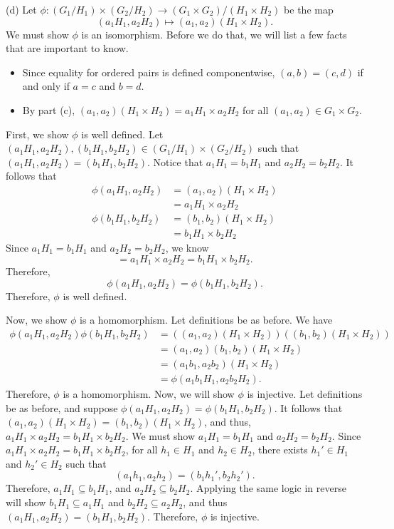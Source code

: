 \documentclass[11pt, letterpaper]{report}
\begin{document}
\begin{solution}
	(d) Let $\phi  : \left( G_1 / H_1 \right) \times \left( G_2 / H_2 \right)  \to \left( G_1 \times G_2 \right) / \left( H_1 \times H_2 \right) $ be the map
	\[
		(a_1H_1, a_2H_2)\mapsto (a_1,a_2)(H_1\times H_2)
	.\]
	We must show $\phi $ is an isomorphism. Before we do that, we will list a few facts that are important to know.
	\begin{itemize}
		\item Since equality for ordered pairs is defined componentwise, $(a,b)=(c,d)$ if and only if $a=c$ and $b=d$.
		\item By part (c), $(a_1,a_2)(H_1\times H_2)=a_1H_1\times a_2H_2$ for all $(a_1,a_2)\in G_1\times G_2$.
	\end{itemize}
	First, we show $\phi $ is well defined. Let $\left( a_1H_1,a_2H_2 \right) ,(b_1H_1,b_2H_2)\in(G_1 / H_1)\times (G_2 / H_2)$ such that $(a_1H_1,a_2H_2)=(b_1H_1,b_2H_2) $. Notice that $a_1H_1=b_1H_1$ and $a_2H_2=b_2H_2$. It follows that
	\begin{align*}
		\phi (a_1H_1,a_2H_2)&=(a_1,a_2)(H_1\times H_2)\\
				    &=a_1H_1\times a_2H_2\\
		\phi (b_1H_1,b_2H_2)&=(b_1,b_2)(H_1\times H_2)\\
				    &=b_1H_1\times b_2H_2
	\end{align*}
	Since $a_1H_1=b_1H_1$ and $a_2H_2=b_2H_2$, we know
	\[=a_1H_1\times a_2H_2 = b_1H_1\times b_2H_2.\]
	Therefore,
\[\phi (a_1H_1,a_2H_2)=\phi (b_1H_1,b_2H_2).\]
	Therefore, $\phi $ is well defined.

	Now, we show $\phi $ is a homomorphism. Let definitions be as before. We have
	\begin{align*}
		\phi \left( a_1H_1,a_2H_2\right)\phi \left(b_1H_1,b_2H_2 \right)&=\left( (a_1,a_2)(H_1\times H_2) \right) \left( (b_1,b_2)(H_1\times H_2) \right) \\
										&=(a_1,a_2)(b_1,b_2)(H_1\times H_2)\\
										&=(a_1b_1,a_2b_2)(H_1\times H_2)\\
										&=\phi (a_1b_1H_1,a_2b_2H_2)
	.\end{align*}
	Therefore, $\phi $ is a homomorphism. Now, we will show $\phi $ is injective. Let definitions be as before, and suppose  $\phi (a_1H_1,a_2H_2)=\phi (b_1H_1,b_2H_2)$. It follows that $(a_1,a_2)(H_1\times H_2)=(b_1,b_2)(H_1\times H_2)$, and thus, $a_1H_1\times a_2H_2=b_1H_1\times b_2H_2$. We must show $a_1H_1=b_1H_1$ and $a_2H_2=b_2H_2$. Since $a_1H_1\times a_2H_2=b_1H_1\times b_2H_2$, for all $h_1\in H_1$ and $h_2\in H_2$, there exists $h_1'\in H_1$ and $h_2'\in H_2$ such that
	\[
		(a_1h_1,a_2h_2)=(b_1h_1',b_2h_2')
	.\]
	Therefore, $a_1H_1\subseteq b_1H_1$, and $a_2H_2\subseteq b_2H_2$. Applying the same logic in reverse will show $b_1H_1\subseteq a_1H_1$ and $b_2H_2\subseteq a_2H_2$, and thus $(a_1H_1,a_2H_2)=(b_1H_1,b_2H_2)$. Therefore, $\phi $ is injective.


\end{solution}
\end{document}
